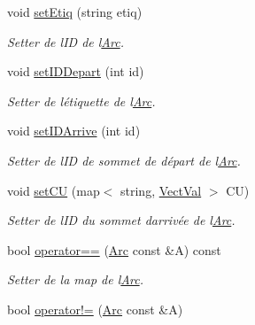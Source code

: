 \begin{DoxyCompactItemize}
\mbox{\label{classArc_ac3c9947070353bd49b73dca9529cbbdd}} 
void \hyperlink{classArc_ac3c9947070353bd49b73dca9529cbbdd}{set\+Etiq} (string etiq)
\begin{DoxyCompactList}\small\item\em Setter de l\textquotesingle{}ID de l\textquotesingle{}\hyperlink{classArc}{Arc}. \end{DoxyCompactList}\item 
\mbox{\label{classArc_acc7e5462ba03be22dfad211d17688f90}} 
void \hyperlink{classArc_acc7e5462ba03be22dfad211d17688f90}{set\+I\+D\+Depart} (int id)
\begin{DoxyCompactList}\small\item\em Setter de l\textquotesingle{}\'{e}tiquette de l\textquotesingle{}\hyperlink{classArc}{Arc}. \end{DoxyCompactList}\item 
\mbox{\label{classArc_ae71808dfcda327171371ac1a48ff2ecd}} 
void \hyperlink{classArc_ae71808dfcda327171371ac1a48ff2ecd}{set\+I\+D\+Arrive} (int id)
\begin{DoxyCompactList}\small\item\em Setter de l\textquotesingle{}ID de sommet de d\'{e}part de l\textquotesingle{}\hyperlink{classArc}{Arc}. \end{DoxyCompactList}\item 
\mbox{\label{classArc_a4e395e776bb0ee5d59440c06a963351e}} 
void \hyperlink{classArc_a4e395e776bb0ee5d59440c06a963351e}{set\+CU} (map$<$ string, \hyperlink{structVectVal}{Vect\+Val} $>$ CU)
\begin{DoxyCompactList}\small\item\em Setter de l\textquotesingle{}ID du sommet d\textquotesingle{}arriv\'{e}e de l\textquotesingle{}\hyperlink{classArc}{Arc}. \end{DoxyCompactList}\item 
bool \hyperlink{classArc_a1ecb11f2ae37d975195415bcd7a8c1f8}{operator==} (\hyperlink{classArc}{Arc} const \&A) const
\begin{DoxyCompactList}\small\item\em Setter de la map de l\textquotesingle{}\hyperlink{classArc}{Arc}. \end{DoxyCompactList}\item 
bool \hyperlink{classArc_acf0cfb8db461ae9ae32e51542282f62a}{operator!=} (\hyperlink{classArc}{Arc} const \&A)

\end{DoxyCompactItemize}

